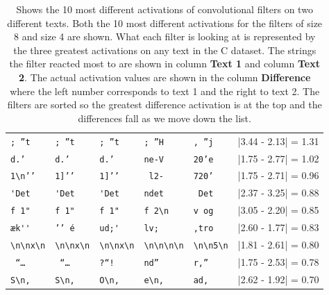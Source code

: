 \begin{table}
\begin{tabular}{lll|lll}
        \verb[; ”t[       & \verb[; ”t[       & \verb[; ”t[          &
        \verb'; ”H'       & \verb', ”j'       & |3.44 - 2.13| = 1.31 \\

        \verb[d.’ [       & \verb[d.’ [       & \verb[d.’ [          &
        \verb'ne-V'       & \verb'20’e'       & |1.75 - 2.77| = 1.02 \\

        \verb[1\n’’[      & \verb[1]’’[       & \verb[1]’’[          &
        \verb' l2-'       & \verb'720’'       & |1.75 - 2.71| = 0.96 \\

        \verb['Det[       & \verb['Det[       & \verb['Det[          &
        \verb'ndet'       & \verb' Det'       & |2.37 - 3.25| = 0.88 \\

        \verb[f 1"[       & \verb[f 1"[       & \verb[f 1"[          &
        \verb'f 2\n'      & \verb'v og'       & |3.05 - 2.20| = 0.85 \\

        \verb[æk''[       & \verb[’’ é[       & \verb[ud;'[          &
        \verb'lv; '       & \verb',tro'       & |2.60 - 1.77| = 0.83 \\

        \verb[\n\nx\n[    & \verb[\n\nx\n[    & \verb[\n\nx\n[       &
        \verb'\n\n\n\n'   & \verb'\n\n5\n'    & |1.81 - 2.61| = 0.80 \\
        \verb[ “… [       & \verb[ “… [       & \verb[?“! [          &
        \verb'nd” '       & \verb'r,” '       & |1.75 - 2.53| = 0.78 \\

        \verb[S\n, [      & \verb[S\n, [      & \verb[O\n, [         &
        \verb'e\n, '      & \verb'ad, '       & |2.62 - 1.92| = 0.70 \\
    \end{tabular}

    \caption{Shows the 10 most different activations of convolutional filters
    on two different texts. Both the 10 most different activations for the
    filters of size 8 and size 4 are shown. What each filter is looking at is
    represented by the three greatest activations on any text in the \gls{C}
    dataset. The strings the filter reacted most to are shown in column
    \textbf{Text 1} and column \textbf{Text 2}. The actual activation values
    are shown in the column \textbf{Difference} where the left number corresponds
    to text 1 and the right to text 2. The filters are sorted so the
    greatest difference activation is at the top and the differences fall as we
    move down the list.}

    \label{tab:teacher_feedback_output}
\end{table}

